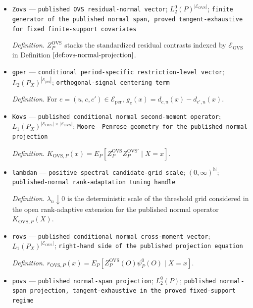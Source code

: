 \documentclass{article}
\begin{document}
\begin{itemize}
  \item \texttt{Zovs} --- \texttt{published OVS residual-\allowbreak{}normal vector}; \(L_2^0(P)^{|\mathcal E_{\mathrm{OVS}}|}\); \texttt{finite generator of the published normal span,\allowbreak{} proved tangent-\allowbreak{}exhaustive for fixed finite-\allowbreak{}support covariates}
  \par\smallskip\noindent\emph{Definition.} \(Z_P^{\mathrm{OVS}}\) stacks the standardized residual contrasts indexed by \(\mathcal E_{\mathrm{OVS}}\) in Definition \(\ref{def:ovs-normal-projection}\).
  \item \texttt{gper} --- \texttt{conditional period-\allowbreak{}specific restriction-\allowbreak{}level vector}; \(L_2(P_X)^{|\mathcal E_{\mathrm{per}}|}\); \texttt{orthogonal-\allowbreak{}signal centering term}
  \par\smallskip\noindent\emph{Definition.} For \(e=(u,c,c')\in\mathcal E_{\mathrm{per}}\), \(g_e(x)=d_{c,u}(x)-d_{c',u}(x)\).
  \item \texttt{Kovs} --- \texttt{published conditional normal second-\allowbreak{}moment operator}; \(L_1(P_X)^{|\mathcal E_{\mathrm{OVS}}|\times|\mathcal E_{\mathrm{OVS}}|}\); \texttt{Moore-\allowbreak{}-\allowbreak{}Penrose geometry for the published normal projection}
  \par\smallskip\noindent\emph{Definition.} \(K_{\mathrm{OVS},P}(x)=E_P[Z_P^{\mathrm{OVS}}Z_P^{\mathrm{OVS}\prime}\mid X=x]\).
  \item \texttt{lambdan} --- \texttt{positive spectral candidate-\allowbreak{}grid scale}; \((0,\infty)^{\mathbb N}\); \texttt{published-\allowbreak{}normal rank-\allowbreak{}adaptation tuning handle}
  \par\smallskip\noindent\emph{Definition.} \(\lambda_n\downarrow0\) is the deterministic scale of the threshold grid considered in the open rank-adaptive extension for the published normal operator \(K_{\mathrm{OVS},P}(X)\).
  \item \texttt{rovs} --- \texttt{published conditional normal cross-\allowbreak{}moment vector}; \(L_1(P_X)^{|\mathcal E_{\mathrm{OVS}}|}\); \texttt{right-\allowbreak{}hand side of the published projection equation}
  \par\smallskip\noindent\emph{Definition.} \(r_{\mathrm{OVS},P}(x)=E_P[Z_P^{\mathrm{OVS}}(O)\psi_P^0(O)\mid X=x]\).
  \item \texttt{povs} --- \texttt{published normal-\allowbreak{}span projection}; \(L_2^0(P)\); \texttt{published normal-\allowbreak{}span projection,\allowbreak{} tangent-\allowbreak{}exhaustive in the proved fixed-\allowbreak{}support regime}

\end{itemize}
\end{document}
